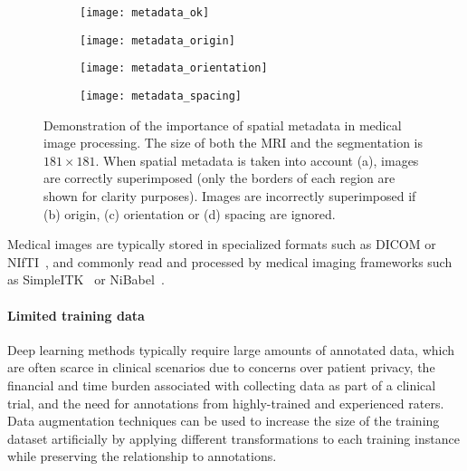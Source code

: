 \begin{figure}
  \centering

  \begin{subfigure}{0.24\textwidth}
    \texttt{[image: metadata\_ok]}
    \caption{}
    \label{fig:meta_ok}
  \end{subfigure}
  \hfill
  \begin{subfigure}{0.24\textwidth}
    \texttt{[image: metadata\_origin]}
    \caption{}
    \label{fig:meta_origin}
  \end{subfigure}
  \hfill
  \begin{subfigure}{0.24\textwidth}
    \texttt{[image: metadata\_orientation]}
    \caption{}
    \label{fig:meta_orientation}
  \end{subfigure}
  \hfill
  \begin{subfigure}{0.24\textwidth}
    \texttt{[image: metadata\_spacing]}
    \caption{}
    \label{fig:meta_spacing}
  \end{subfigure}

  \caption[Demonstration of the importance of spatial metadata in medical image processing]{
    Demonstration of the importance of spatial metadata in medical image processing.
    The size of both the \ac{MRI} and the segmentation is $181 \times 181$.
    When spatial metadata is taken into account (a), images are correctly superimposed (only the borders of each region are shown for clarity purposes).
    Images are incorrectly superimposed if (b) origin, (c) orientation or (d) spacing are ignored.
  }
  \label{fig:metadata}
\end{figure}



Medical images are typically stored in specialized formats such as \ac{DICOM} or \ac{NIfTI}~\cite{larobina_medical_2014}, and commonly read and processed by medical imaging frameworks
such as SimpleITK~\cite{lowekamp_design_2013} or NiBabel~\cite{brett_nipynibabel_2020}.


\paragraph{Limited training data}

Deep learning methods typically require large amounts of annotated data, which are often scarce in clinical scenarios due to concerns over patient privacy, the financial and time burden associated with collecting data as part of a clinical trial, and the need for annotations from highly-trained and experienced raters.
Data augmentation techniques can be used to increase the size of the training dataset artificially by applying different transformations to each training instance while preserving the relationship to annotations.

